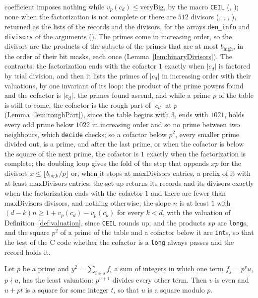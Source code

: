 \begin{definition}
  coefficient imposes nothing while $v_p(c_d) \le \mathrm{veryBig}$, by the macro \verb|CEIL|
  (, ); none when the factorization
  is not complete or there are $512$ divisors (,
  , ,
  ), returned as the lists of the records and the divisors, for the
  arrays \verb|den_info| and \verb|divisors| of the arguments ().
  The primes come in increasing order, so the divisors are the
  products of the subsets of the primes that are at most $b_{\mathrm{high}}$, in the order of their
  bit masks, each once (Lemma~\ref{lem:binaryDivisors}). The contracts: the factorization ends with
  the cofactor $1$ exactly when $|c_d|$ is factored by trial division, and then it lists the primes
  of $|c_d|$ in increasing order with their valuations, by one invariant of its loop: the product of
  the prime powers found and the cofactor is $|c_d|$, the primes found ascend, and while a prime $p$
  of the table is still to come, the cofactor is the rough part of $|c_d|$ at $p$
  (Lemma~\ref{lem:roughPart}), since the table begins with $3$, ends with $1021$, holds every odd
  prime below $1022$ in increasing order and so no prime between two neighbours, which \verb|decide|
  checks; so a cofactor below $p^2$, every smaller prime divided out, is a prime, and after the last
  prime, or when the cofactor is below the square of the next prime, the cofactor is $1$ exactly
  when the factorization is complete; the doubling loop gives the fold of the step that appends
  $x p$ for the divisors $x \le \lfloor b_{\mathrm{high}} / p \rfloor$ or, when it stops at
  $\mathrm{maxDivisors}$ entries, a prefix of it with at least $\mathrm{maxDivisors}$ entries; the
  set-up returns its records and its divisors exactly when the factorization ends with the cofactor
  $1$ and there are fewer than $\mathrm{maxDivisors}$ divisors, and nothing otherwise; the slope $n$
  is at least $1$ with $(d - k) n \ge 1 + v_p(c_d) - v_p(c_k)$ for every $k < d$, with the valuation
  of Definition~\ref{def:valuation}, since \verb|CEIL| rounds up; and the products $x p$ are
  \verb|long|s, and the square $p^2$ of a prime of the table and a cofactor below it are
  \verb|int|s, so that the test of the C code whether the cofactor is a \verb|long| always passes
  and the record holds it.
\end{definition}

\begin{lemma}\label{lem:least_valuation}
  \leanok
  Let $p$ be a prime and $y^2 = \sum_{i \in s} f_i$ a sum of integers in which one term
  $f_j = p^v u$, $p \nmid u$, has the least valuation: $p^{v + 1}$ divides every other term. Then
  $v$ is even and $u + p t$ is a square for some integer $t$, so that $u$ is a square modulo $p$.
\end{lemma}

